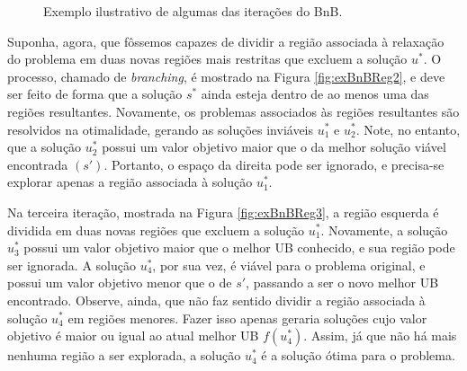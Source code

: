 {\begin{figure}[ht!]
{{
        }
        \label{fig:exBnBReg3} 
    }
    
    \caption{Exemplo ilustrativo de algumas das iterações do BnB.}
    \label{fig:exBnBRegioes}
\end{figure}


Suponha, agora, que fôssemos capazes de dividir a região associada à relaxação do problema em duas novas regiões mais restritas que excluem a solução $u^*$. O processo, chamado de \textit{branching}, é mostrado na Figura \ref{fig:exBnBReg2}, e deve ser feito de forma que a solução $s^*$ ainda esteja dentro de ao menos uma das regiões resultantes. Novamente, os problemas associados às regiões resultantes são resolvidos na otimalidade, gerando as soluções inviáveis $u^*_1$ e $u^*_2$. Note, no entanto, que a solução $u^*_2$ possui um valor objetivo maior que o da melhor solução viável encontrada $(s')$. Portanto, o espaço da direita pode ser ignorado, e precisa-se explorar apenas a região associada à solução $u^*_1$.

Na terceira iteração, mostrada na Figura \ref{fig:exBnBReg3}, a região esquerda é dividida em duas novas regiões que excluem a solução $u^*_1$. Novamente, a solução $u^*_3$ possui um valor objetivo maior que o melhor UB conhecido, e sua região pode ser ignorada. A solução $u^*_4$, por sua vez, é viável para o problema original, e possui um valor objetivo menor que o de $s'$, passando a ser o novo melhor UB encontrado. Observe, ainda, que não faz sentido dividir a região associada à solução $u^*_4$ em regiões menores. Fazer isso apenas geraria soluções cujo valor objetivo é maior ou igual ao atual melhor UB $f(u^*_4)$. Assim, já que não há mais nenhuma região a ser explorada, a solução $u_4^*$ é a solução ótima para o problema.


}
